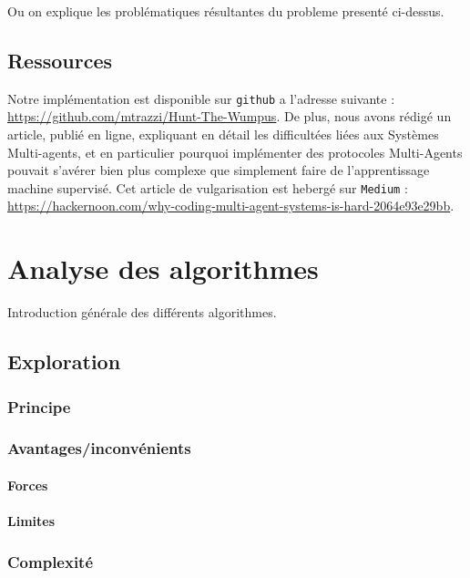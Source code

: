 \documentclass[a4paper, 10pt]{article}
\begin{document}
Ou on explique les problématiques résultantes du probleme presenté ci-dessus.

\subsection{Ressources}

Notre implémentation est disponible sur \verb|github| a l'adresse suivante : \url{https://github.com/mtrazzi/Hunt-The-Wumpus}. De plus, nous avons rédigé un article, publié en ligne, expliquant en détail les difficultées liées aux Systèmes Multi-agents, et en particulier pourquoi implémenter des protocoles Multi-Agents pouvait s'avérer bien plus complexe que simplement faire de l'apprentissage machine supervisé. Cet article de vulgarisation est hebergé sur \verb|Medium| : \url{https://hackernoon.com/why-coding-multi-agent-systems-is-hard-2064e93e29bb}.

\section{Analyse des algorithmes}

Introduction générale des différents algorithmes.

\subsection{Exploration}

\subsubsection{Principe}

\subsubsection{Avantages/inconvénients}

\paragraph{Forces}

\paragraph{Limites}

\subsubsection{Complexité}
\end{document}
